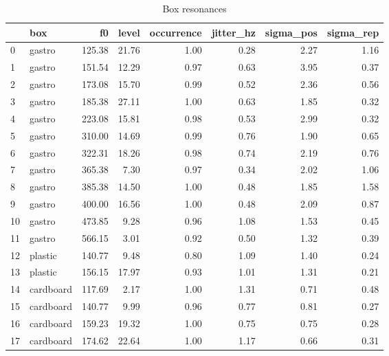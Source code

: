 \begin{table}
\caption{Box resonances}
\label{tab:box_resonances}
\begin{tabular}{llrrrrrr}
\toprule
 & box & f0 & level & occurrence & jitter\_hz & sigma\_pos & sigma\_rep \\
\midrule
0 & gastro & 125.38 & 21.76 & 1.00 & 0.28 & 2.27 & 1.16 \\
1 & gastro & 151.54 & 12.29 & 0.97 & 0.63 & 3.95 & 0.37 \\
2 & gastro & 173.08 & 15.70 & 0.99 & 0.52 & 2.36 & 0.56 \\
3 & gastro & 185.38 & 27.11 & 1.00 & 0.63 & 1.85 & 0.32 \\
4 & gastro & 223.08 & 15.81 & 0.98 & 0.53 & 2.99 & 0.32 \\
5 & gastro & 310.00 & 14.69 & 0.99 & 0.76 & 1.90 & 0.65 \\
6 & gastro & 322.31 & 18.26 & 0.98 & 0.74 & 2.19 & 0.76 \\
7 & gastro & 365.38 & 7.30 & 0.97 & 0.34 & 2.02 & 1.06 \\
8 & gastro & 385.38 & 14.50 & 1.00 & 0.48 & 1.85 & 1.58 \\
9 & gastro & 400.00 & 16.56 & 1.00 & 0.48 & 2.09 & 0.87 \\
10 & gastro & 473.85 & 9.28 & 0.96 & 1.08 & 1.53 & 0.45 \\
11 & gastro & 566.15 & 3.01 & 0.92 & 0.50 & 1.32 & 0.39 \\
12 & plastic & 140.77 & 9.48 & 0.80 & 1.09 & 1.40 & 0.24 \\
13 & plastic & 156.15 & 17.97 & 0.93 & 1.01 & 1.31 & 0.21 \\
14 & cardboard & 117.69 & 2.17 & 1.00 & 1.31 & 0.71 & 0.48 \\
15 & cardboard & 140.77 & 9.99 & 0.96 & 0.77 & 0.81 & 0.27 \\
16 & cardboard & 159.23 & 19.32 & 1.00 & 0.75 & 0.75 & 0.28 \\
17 & cardboard & 174.62 & 22.64 & 1.00 & 1.17 & 0.66 & 0.31 \\
\bottomrule
\end{tabular}
\end{table}
